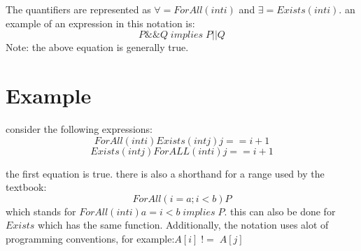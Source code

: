 \documentclass[12pt]{book}
\begin{document}
The quantifiers are represented as $\forall = ForAll(int i)$ and $\exists = Exists(int i)$.
an example of an expression in this notation is:
\[P\&\&Q\;implies\;P||Q\]
Note: the above equation is generally true.

\section*{Example}
consider the following expressions:
\[ForAll(int i)Exists(int j)j == i+1\]
\[Exists(int j)ForALL(int i)j == i+1\]

the first equation is true.
there is also a shorthand for a range used by the textbook:
\[ForAll(i=a; i<b)P\]
which stands for $ForAll(int i)a=i<b\;implies\;P$.
this can also be done for $Exists$ which has the same function.
Additionally, the notation uses alot of programming conventions, for example:$A[i]\;!=\;A[j]$
\end{document}
